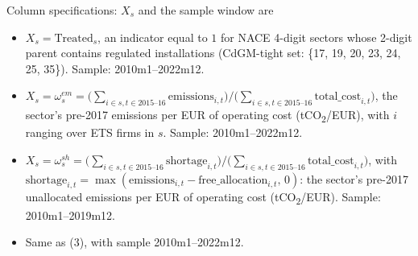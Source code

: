 \begin{table}[H]
\begin{minipage}{0.95\textwidth}
        \vspace{0.5em}
        Column specifications: $X_s$ and the sample window are
        \begin{itemize}
            \item[(1)] $X_s = \text{Treated}_s$, an indicator equal to $1$ for NACE 4-digit sectors whose 2-digit parent contains regulated installations (CdGM-tight set: \{17, 19, 20, 23, 24, 25, 35\}). Sample: 2010m1--2022m12.
            \item[(2)] $X_s = \omega^{em}_s = \big(\sum_{i \in s, t \in 2015\text{--}16} \text{emissions}_{i,t}\big) / \big(\sum_{i \in s, t \in 2015\text{--}16} \text{total\_cost}_{i,t}\big)$, the sector's pre-2017 emissions per EUR of operating cost (tCO\textsubscript{2}/EUR), with $i$ ranging over ETS firms in $s$. Sample: 2010m1--2022m12.
            \item[(3)] $X_s = \omega^{sh}_s = \big(\sum_{i \in s, t \in 2015\text{--}16} \text{shortage}_{i,t}\big) / \big(\sum_{i \in s, t \in 2015\text{--}16} \text{total\_cost}_{i,t}\big)$, with $\text{shortage}_{i,t} = \max(\text{emissions}_{i,t} - \text{free\_allocation}_{i,t}, \, 0)$: the sector's pre-2017 unallocated emissions per EUR of operating cost (tCO\textsubscript{2}/EUR). Sample: 2010m1--2019m12.
            \item[(4)] Same as (3), with sample 2010m1--2022m12.
        \end{itemize}
    \end{minipage}
\end{table}
